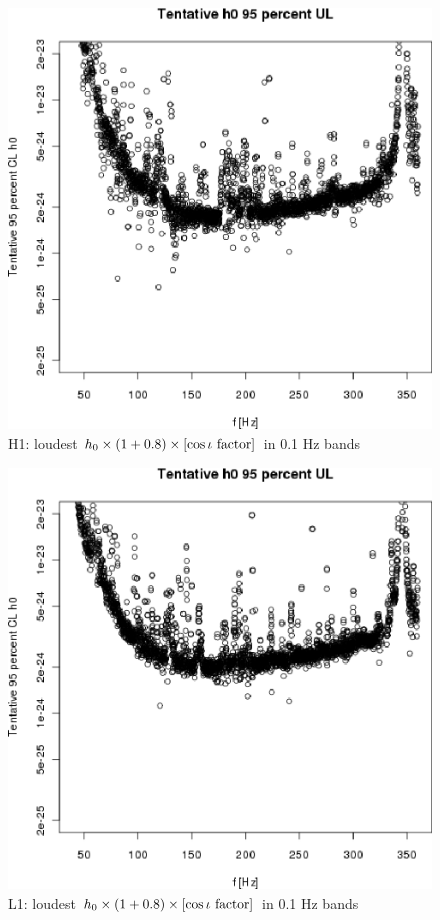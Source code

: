 \begin{figure}
\begin{center}
\includegraphics[width=0.4\paperwidth,height=0.2\paperheight]{plots/h0FullUL95logGuess-H1.eps}
\caption{
H1: loudest $h_0 \times \left( 1 + 0.8 \right) \times \left[\cos \iota \textup{ factor}\right]$ in 0.1 Hz bands}
\end{center}
\end{figure}

\begin{figure}
\begin{center}
\includegraphics[width=0.4\paperwidth,height=0.2\paperheight]{plots/h0FullUL95logGuess-L1.eps}
\caption{
L1: loudest $h_0 \times \left( 1 + 0.8 \right) \times \left[\cos \iota \textup{ factor}\right]$ in 0.1 Hz bands}
\end{center}
\end{figure}

